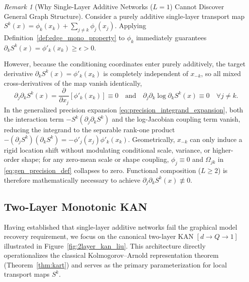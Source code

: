 \documentclass[11pt,a4paper]{article}
\theoremstyle{plain}
\theoremstyle{definition}
\theoremstyle{remark}
\newtheorem{remark}[theorem]{Remark}
\begin{document}
\begin{remark}[Why Single-Layer Additive Networks ($L=1$) Cannot Discover General Graph Structure]
\label{rem:single_layer_failure}
Consider a purely additive single-layer transport map $S^k(x) = \phi_k(x_k) + \sum_{j \neq k} \phi_j(x_j)$. Applying Definition~\ref{def:edge_mono_property} to $\phi_k$ immediately guarantees $\partial_k S^k(x) = \phi'_k(x_k) \ge \epsilon > 0$.

However, because the conditioning coordinates enter purely additively, the target derivative $\partial_k S^k(x) = \phi'_k(x_k)$ is completely independent of $x_{-k}$, so all mixed cross-derivatives of the map vanish identically,
\begin{equation}
    \partial_j \partial_k S^k(x) = \frac{\partial}{\partial x_j} [\phi'_k(x_k)] \equiv 0 \quad \text{and} \quad \partial_j \partial_k \log \partial_k S^k(x) \equiv 0 \quad \forall j \neq k.
\end{equation}
In the generalized precision expansion \eqref{eq:precision_integrand_expansion}, both the interaction term $-S^k(\partial_j \partial_k S^k)$ and the log-Jacobian coupling term vanish, reducing the integrand to the separable rank-one product $-(\partial_j S^k)(\partial_k S^k) = -\phi'_j(x_j)\phi'_k(x_k)$. Geometrically, $x_{-k}$ can only induce a rigid location shift without modulating conditional scale, variance, or higher-order shape; for any zero-mean scale or shape coupling, $\phi_j \equiv 0$ and $\Omega_{jk}$ in \eqref{eq:gen_precision_def} collapses to zero. Functional composition ($L \ge 2$) is therefore mathematically necessary to achieve $\partial_j \partial_k S^k(x) \not\equiv 0$.
\end{remark}

\subsection{Two-Layer Monotonic KAN}
\label{subsec:two_layer_kan}

Having established that single-layer additive networks fail the graphical model recovery requirement, we focus on the canonical two-layer KAN $[d \to Q \to 1]$ illustrated in Figure~\ref{fig:2layer_kan_liu}. This architecture directly operationalizes the classical Kolmogorov--Arnold representation theorem (Theorem~\ref{thm:kart}) and serves as the primary parameterization for local transport maps $S^k$.
\end{document}
